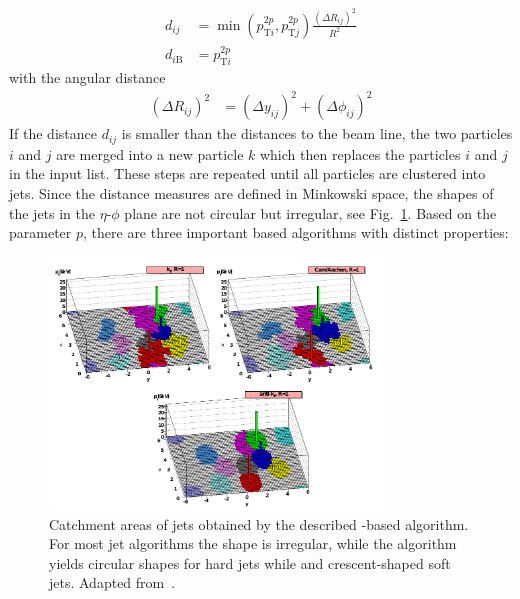 \begin{align*} 
    d_{ij} &= \min(p_{\mathrm{T}i}^{2p},p_{\mathrm{T}j}^{2p})\frac{\left(\Delta
        R_{ij}\right)^2}{R^2}\\
    d_{i\mathrm{B}} &= p_{\mathrm{T}i}^{2p}
\end{align*} 
%
with the angular distance
%
\begin{align*}
    \left(\Delta R_{ij}\right)^2 &= (\Delta y_{ij})^2 + (\Delta \phi_{ij})^2
\end{align*} 
%
If the distance $d_{ij}$ is smaller than the distances to the beam line, the two
particles $i$ and $j$ are merged into a new particle $k$ which then replaces the
particles $i$ and $j$ in the input list. These steps are repeated until all
particles are clustered into jets. Since the distance measures are defined in
Minkowski space, the shapes of the jets in the $\eta$-$\phi$ plane are not circular but
irregular, see Fig.~\ref{fig:jet_shapes}. Based on the parameter $p$, there
are three important \kt based algorithms with distinct properties:

\begin{figure}[htbp]
    \centering
    \includegraphics[width=0.8\textwidth]{figures/theoretical_foundations/jet_shapes.pdf}
    \caption[Jet areas of various jet algorithms]{Catchment areas of jets
        obtained by the described \kt-based algorithm. For most jet algorithms the shape is
        irregular, while the \antikt algorithm yields circular shapes for hard
        jets while and crescent-shaped soft jets. Adapted
        from~\cite{Salam:2009jx}.}
    \label{fig:jet_shapes}
\end{figure}

